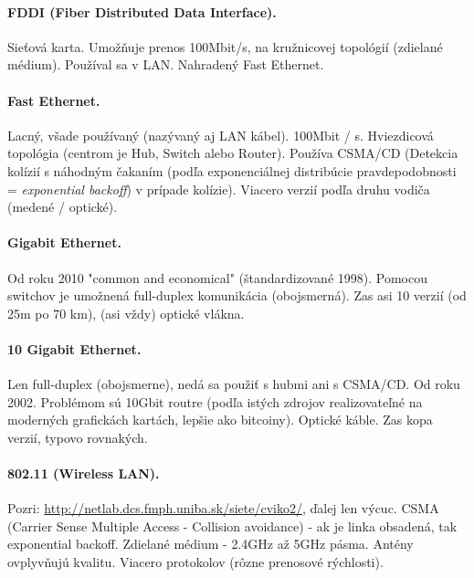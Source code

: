 {{\paragraph{FDDI (Fiber Distributed Data Interface).}  
Sieťová karta. Umožňuje prenos 100Mbit/s, na kružnicovej topológií (zdielané médium). Používal sa v LAN. Nahradený Fast Ethernet.    
                 
\paragraph{Fast Ethernet.}            
Lacný, všade používaný (nazývaný aj LAN kábel).
100Mbit / s. Hviezdicová topológia (centrom je Hub, Switch alebo Router).
Používa CSMA/CD (Detekcia kolízií s náhodným čakaním (podľa exponenciálnej distribúcie pravdepodobnosti = \emph{exponential backoff}) v prípade kolízie). Viacero verzií podľa druhu vodiča (medené / optické).

\paragraph{Gigabit Ethernet.}       
Od roku 2010 "common and economical" (štandardizované 1998). Pomocou switchov je umožnená full-duplex komunikácia (obojsmerná). 
Zas asi 10 verzií (od 25m po 70 km), (asi vždy) optické vlákna. 

\paragraph{10 Gigabit Ethernet.}  
Len full-duplex (obojsmerne), nedá sa použiť s hubmi ani s CSMA/CD. 
Od roku 2002. Problémom sú 10Gbit routre (podľa istých zdrojov realizovateľné na moderných grafickách kartách, lepšie ako bitcoiny). Optické káble. Zas kopa verzií, typovo rovnakých. 

\paragraph{802.11 (Wireless LAN).}  

Pozri: \url{http://netlab.dcs.fmph.uniba.sk/siete/cviko2/}, ďalej len výcuc. 
CSMA (Carrier Sense Multiple Access - Collision avoidance) - ak je linka obsadená, tak exponential backoff. Zdielané médium - 2.4GHz až 5GHz pásma. 
Antény ovplyvňujú kvalitu. Viacero protokolov (rôzne prenosové rýchlosti).

}}
